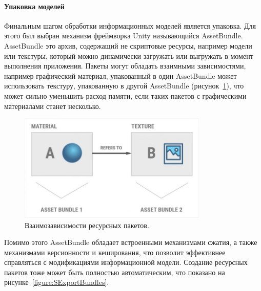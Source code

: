 ﻿\paragraph{Упаковка моделей}

Финальным шагом обработки информационных моделей является упаковка.
Для этого был выбран механизм фреймворка Unity называющийся AssetBundle.
AssetBundle это архив, содержащий не скриптовые ресурсы,
например модели или текстуры, который можно динамически загружать
или выгружать в момент выполнения приложения.
Пакеты могут обладать взаимными зависимостями, например графический материал,
упакованный в один AssetBundle может использовать текстуру,
упакованную в другой AssetBundle (рисунок~\ref{figure:AssetBundleDependency}),
что может сильно уменьшить расход памяти, если таких пакетов
с графическими материалами станет несколько.%
\cite{DocUnity,UnityAssetsResourcesBundles}

\begin{figure}[ht]
    \centering
    \includegraphics[width=0.8\textwidth]{images/AssetBundleDependency.png}
    \caption{Взаимозависимости ресурсных пакетов.%
    \cite{UnityAssetsResourcesBundles}}
    \label{figure:AssetBundleDependency}
\end{figure}

Помимо этого AssetBundle обладает встроенными механизмами сжатия,
а также механизмами версионности и кеширования,
что позволит эффективнее справляться с модификациями информационной модели.%
\cite{DocUnity,UnityAssetsResourcesBundles}
Создание ресурсных пакетов тоже может быть полностью автоматическим,
что показано на рисунке~\ref{figure:SExportBundles}.

